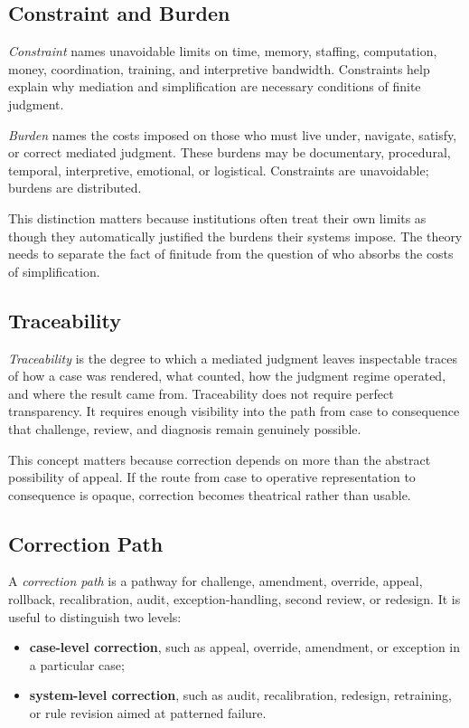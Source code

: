 \documentclass[11pt]{article}
\renewcommand{\emph}[1]{\textit{#1}}
\begin{document}
\subsection{Constraint and Burden}

\emph{Constraint} names unavoidable limits on time, memory, staffing, computation, money, coordination, training, and interpretive bandwidth. Constraints help explain why mediation and simplification are necessary conditions of finite judgment.

\emph{Burden} names the costs imposed on those who must live under, navigate, satisfy, or correct mediated judgment. These burdens may be documentary, procedural, temporal, interpretive, emotional, or logistical. Constraints are unavoidable; burdens are distributed.\cite{MoynihanHerdHarvey2015AdministrativeBurden,Eubanks2018AutomatingInequality}

This distinction matters because institutions often treat their own limits as though they automatically justified the burdens their systems impose. The theory needs to separate the fact of finitude from the question of who absorbs the costs of simplification.

\subsection{Traceability}

\emph{Traceability} is the degree to which a mediated judgment leaves inspectable traces of how a case was rendered, what counted, how the judgment regime operated, and where the result came from. Traceability does not require perfect transparency. It requires enough visibility into the path from case to consequence that challenge, review, and diagnosis remain genuinely possible.

This concept matters because correction depends on more than the abstract possibility of appeal. If the route from case to operative representation to consequence is opaque, correction becomes theatrical rather than usable.

\subsection{Correction Path}

A \emph{correction path} is a pathway for challenge, amendment, override, appeal, rollback, recalibration, audit, exception-handling, second review, or redesign. It is useful to distinguish two levels:
\begin{itemize}
    \item \textbf{case-level correction}, such as appeal, override, amendment, or exception in a particular case;
    \item \textbf{system-level correction}, such as audit, recalibration, redesign, retraining, or rule revision aimed at patterned failure.
\end{itemize}
\end{document}
